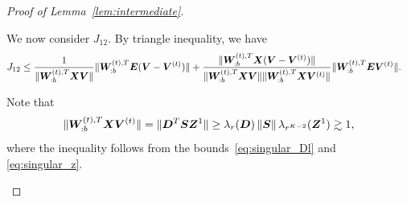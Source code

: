 \documentclass[lettersize,onecolumn,journal]{IEEEtran}
\theoremstyle{definition}
\theoremstyle{definition}
\begin{document}
\begin{proof}[Proof of Lemma~\ref{lem:intermediate}]
\begin{enumerate}[wide]
    
    We now consider $J_{12}$. By triangle inequality, we have 
    \begin{align}
        J_{12} &\leq \frac{ 1}{\lVert\bm{W}_{:b}^{(t),T} \bm X \bm{V} \rVert} \lVert\bm{W}_{:b}^{(t),T} \bm{E} (\bm{V}-\bm{V}^{(t)})\rVert   +
        \frac{ \lVert\bm{W}_{:b}^{(t),T} \bm X (\bm{V}-\bm{V}^{(t)})\rVert }{\lVert\bm{W}_{:b}^{(t),T} \bm X \bm{V} \rVert\lVert\bm{W}_{:b}^{(t),T} \bm X \bm{V}^{(t)} \rVert} \lVert\bm{W}_{:b}^{(t),T} \bm{E} \bm{V}^{(t)} \rVert.
    \end{align}

     Note that 
    \begin{equation}\label{eq:j11_wxvt}
       \onormSize{}{\mW_{:b}^{(t),T} \mX \mV^{(t)}} = \onormSize{}{\mD^T \mS \mZ^1} \geq \lambda_r(\mD) \onorm{\mS} \lambda_{r^{K-2}}(\mZ^1) \gtrsim 1,
    \end{equation}
    where the inequality follows from the bounds~\eqref{eq:singular_Dl} and \eqref{eq:singular_z}.
    

\end{enumerate}
\end{proof}
\end{document}
